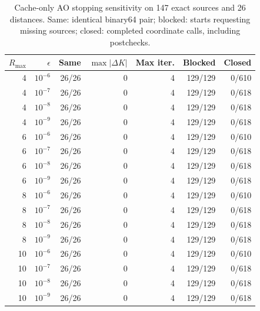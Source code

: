 \begin{table}[t]
\centering
\caption{Cache-only AO stopping sensitivity on 147 exact sources and 26 distances. Same: identical binary64 pair; blocked: starts requesting missing sources; closed: completed coordinate calls, including postchecks.}
\label{tab:ao-stopping-sensitivity}
\begin{tabular}{rrrrrrr}
\hline
$R_{\max}$ & $\epsilon$ & Same & $\max|\Delta K|$ & Max iter. & Blocked & Closed \\
\hline
4 & $10^{-6}$ & 26/26 & 0 & 4 & 129/129 & 0/610 \\
4 & $10^{-7}$ & 26/26 & 0 & 4 & 129/129 & 0/618 \\
4 & $10^{-8}$ & 26/26 & 0 & 4 & 129/129 & 0/618 \\
4 & $10^{-9}$ & 26/26 & 0 & 4 & 129/129 & 0/618 \\
6 & $10^{-6}$ & 26/26 & 0 & 4 & 129/129 & 0/610 \\
6 & $10^{-7}$ & 26/26 & 0 & 4 & 129/129 & 0/618 \\
6 & $10^{-8}$ & 26/26 & 0 & 4 & 129/129 & 0/618 \\
6 & $10^{-9}$ & 26/26 & 0 & 4 & 129/129 & 0/618 \\
8 & $10^{-6}$ & 26/26 & 0 & 4 & 129/129 & 0/610 \\
8 & $10^{-7}$ & 26/26 & 0 & 4 & 129/129 & 0/618 \\
8 & $10^{-8}$ & 26/26 & 0 & 4 & 129/129 & 0/618 \\
8 & $10^{-9}$ & 26/26 & 0 & 4 & 129/129 & 0/618 \\
10 & $10^{-6}$ & 26/26 & 0 & 4 & 129/129 & 0/610 \\
10 & $10^{-7}$ & 26/26 & 0 & 4 & 129/129 & 0/618 \\
10 & $10^{-8}$ & 26/26 & 0 & 4 & 129/129 & 0/618 \\
10 & $10^{-9}$ & 26/26 & 0 & 4 & 129/129 & 0/618 \\
\hline
\end{tabular}
\end{table}
